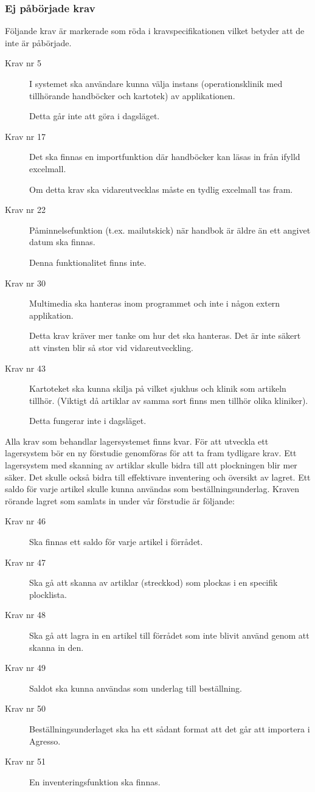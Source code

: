 \documentclass{article}
\begin{document}
\subsubsection{Ej påbörjade krav}
Följande krav är markerade som röda i kravspecifikationen vilket betyder att de inte är påbörjade.

\begin{description}
\item[Krav nr 5]  I systemet ska användare kunna välja instans (operationsklinik med tillhörande handböcker och kartotek) av applikationen. 

Detta går inte att göra i dagsläget. %
\item[Krav nr 17] Det ska finnas en importfunktion där handböcker kan läsas in från ifylld excelmall.

Om detta krav ska vidareutvecklas måste en tydlig excelmall tas fram.
\item[Krav nr 22] Påminnelsefunktion (t.ex. mailutskick) när handbok är äldre än ett angivet datum ska finnas.

Denna funktionalitet finns inte. %
\item[Krav nr 30] Multimedia ska hanteras inom programmet och inte i någon extern applikation.

Detta krav kräver mer tanke om hur det ska hanteras. Det är inte säkert att vinsten blir så stor vid vidareutveckling.%
\item[Krav nr 43] Kartoteket ska kunna skilja på vilket sjukhus och klinik som artikeln tillhör. (Viktigt då artiklar av samma sort finns men tillhör olika kliniker). 

Detta fungerar inte i dagsläget. %
\end{description}


Alla krav som behandlar lagersystemet finns kvar. För att utveckla ett lagersystem bör en ny förstudie genomföras för att ta fram tydligare krav. Ett lagersystem med skanning av artiklar skulle bidra till att plockningen blir mer säker. Det skulle också bidra till effektivare inventering och översikt av lagret. Ett saldo för varje artikel skulle kunna användas som beställningsunderlag. Kraven rörande lagret som samlats in under vår förstudie är följande:
\begin{description}
\item[Krav nr 46] Ska finnas ett saldo för varje artikel i förrådet.
\item[Krav nr 47] Ska gå att skanna av artiklar (streckkod) som plockas i en specifik plocklista.
\item[Krav nr 48] Ska gå att lagra in en artikel till förrådet som inte blivit använd genom att skanna in den.
\item[Krav nr 49] Saldot ska kunna användas som underlag till beställning.
\item[Krav nr 50] Beställningsunderlaget ska ha ett sådant format att det går att importera i Agresso.
\item[Krav nr 51] En inventeringsfunktion ska finnas.
\end{description}
\end{document}
